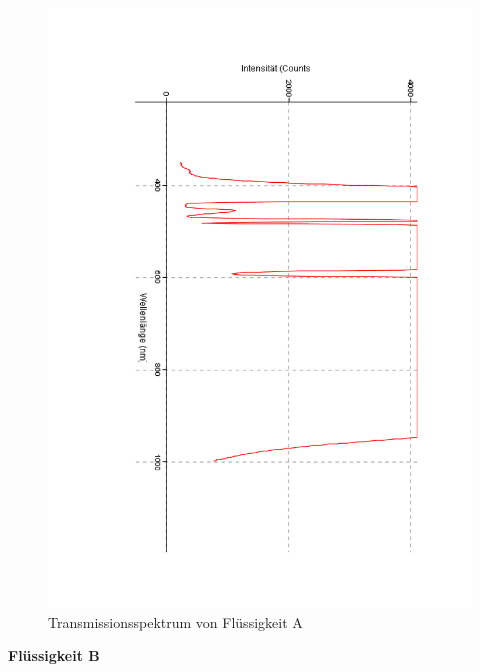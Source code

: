 \documentclass[12pt,a4paper]{article}
\begin{document}
\begin{figure}[H]
	\centering
	\includegraphics[scale=0.5,angle = 90,trim = 20mm 20mm 20mm 20mm]{./data/Spektro/Transmission_A_DO_4.pdf}
	\caption{Transmissionsspektrum von Flüssigkeit A}
	\label{fig:TransmissionA}
\end{figure}

\textbf{Flüssigkeit B}
\end{document}
